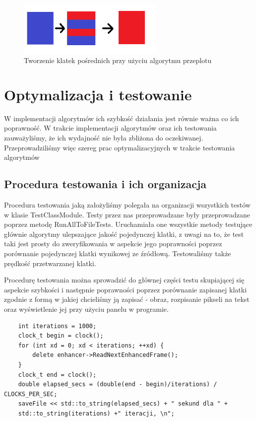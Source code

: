 \documentclass[twoside]{projektInzynierskiMS}
\begin{document}
\begin{figure}[h]
\centering
\includegraphics[width=7cm]{Interlace.png}
\caption{Tworzenie klatek pośrednich przy użyciu algorytmu przeplotu}
\end{figure}

\section{Optymalizacja i testowanie}
W implementacji algorytmów ich szybkość działania jest równie ważna co ich poprawność. W trakcie implementacji algorytmów oraz ich testowania zauważyliśmy, że ich wydajność nie była zbliżona do oczekiwanej. Przeprowadziliśmy więc szereg prac optymalizacyjnych w trakcie testowania algorytmów
\subsection{Procedura testowania i ich organizacja}
Procedura testowania jaką założyliśmy polegała na organizacji wszystkich testów w klasie TestClassModule. Testy przez nas przeprowadzane były przeprowadzane poprzez metodę RunAllToFileTests. Uruchamiała one wszystkie metody testujące głównie algorytmy ulepszające jakość pojedynczej klatki, z uwagi na to, że test taki jest prosty do zweryfikowania w aspekcie jego poprawności poprzez porównanie pojedynczej klatki wynikowej ze źródłową. Testowaliśmy także prędkość przetwarzanej klatki.

Procedurę testowania można sprowadzić do głównej części testu skupiającej się aspekcie szybkości i następnie poprawności poprzez porównanie zapisanej klatki zgodnie z formą w jakiej chcieliśmy ją zapisać - obraz, rozpisanie pikseli na tekst oraz wyświetlenie jej przy użyciu panelu w programie.

\begin{verbatim}
    int iterations = 1000;
    clock_t begin = clock();
    for (int xd = 0; xd < iterations; ++xd) {
        delete enhancer->ReadNextEnhancedFrame();
    }
    clock_t end = clock();
    double elapsed_secs = (double(end - begin)/iterations) / CLOCKS_PER_SEC;
    saveFile << std::to_string(elapsed_secs) + " sekund dla " + 
    std::to_string(iterations) +" iteracji, \n";
\end{verbatim} 
\end{document}
